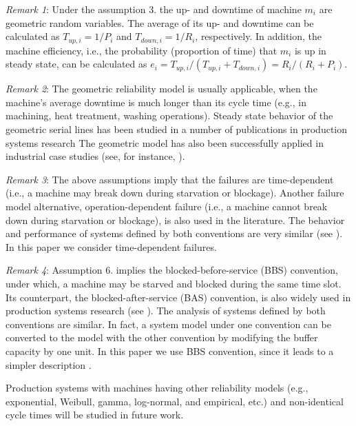 \textsl{Remark 1}: Under the assumption 3. the up- and downtime of machine $m_i$ are geometric random variables. The average of its up- and downtime can be calculated as $T_{up,i}=1 / P_i$ and $T_{down,i} = 1/ R_i$, respectively. In addition, the machine efficiency, i.e., the probability (proportion of time) that $m_i$ is up in steady state, can be calculated as $e_i=T_{up,i}/(T_{up,i}+T_{down,i}) = R_i/(R_i + P_i)$.

\textsl{Remark 2}: The geometric reliability model is usually applicable, when the machine's average downtime is much longer than its cycle time (e.g., in machining, heat treatment, washing operations). Steady state behavior of the geometric serial lines has been studied in a number of publications in production systems research \cite{papadopolous1993queueing,buzacott1993stochastic, gershwin1994manufacturing,altiok1997performance} The geometric model has also been successfully applied in industrial case studies (see, for instance, \cite{li2003due, liberopoulos2007performance}).

\textsl{Remark 3}: The above assumptions imply that the failures are time-dependent (i.e., a machine may break down during starvation or blockage). Another failure model alternative, operation-dependent failure (i.e., a machine cannot break down during starvation or blockage), is also used in the literature. The behavior and performance of systems defined by both conventions are very similar (see \cite{li2006comparisons}). In this paper we consider time-dependent failures.

\textsl{Remark 4}: Assumption 6. implies the blocked-before-service (BBS) convention, under which, a machine may be starved and blocked during the same time slot. Its counterpart, the blocked-after-service (BAS) convention, is also widely used in production systems research (see \cite{dallery1992manufacturing, papadopoulos1996queueing,li2009throughput}). The analysis of systems defined by both conventions are similar. In fact, a system model under one convention can be converted to the model with the other convention by modifying the buffer capacity by one unit. In this paper we use BBS convention, since it leads to a simpler description \cite{li2008production}.

Production systems with machines having other reliability models (e.g., exponential, Weibull, gamma, log-normal, and empirical, etc.) and non-identical cycle times will be studied in future work.



